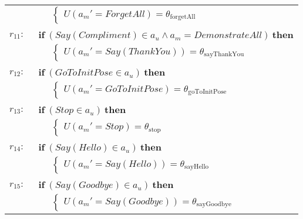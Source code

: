 \begin{footnotesize}
\begin{longtable}{p{1cm}l}
& $\;\;\;\;\; \begin{cases}U(\mathit{a_m}'\!=\!\mathit{ForgetAll})\!=\!\theta_{\mathrm{forgetAll}}\end{cases}$ \\ \\[-1mm]
$r_{11}: \ \ $& $\textbf{if} \ (\mathit{Say(Compliment)}\!\in\!\mathit{a_u} \land \mathit{a_m}\!=\!\mathit{DemonstrateAll}) \ \textbf{then}$ \\
& $\;\;\;\;\; \begin{cases}U(\mathit{a_m}'\!=\!\mathit{Say(ThankYou)})\!=\!\theta_{\mathrm{sayThankYou}}\end{cases}$ \\ \\[-1mm]
$r_{12}: \ \ $& $\textbf{if} \ (\mathit{GoToInitPose}\!\in\!\mathit{a_u}) \ \textbf{then}$ \\
& $\;\;\;\;\; \begin{cases}U(\mathit{a_m}'\!=\!\mathit{GoToInitPose})\!=\!\theta_{\mathrm{goToInitPose}}\end{cases}$  \vspace{1mm} \\  \\[-2mm]
$r_{13}: \ \ $& $\textbf{if} \ (\mathit{Stop}\!\in\!\mathit{a_u}) \ \textbf{then} $\\
& $\;\;\;\;\; \begin{cases}U(\mathit{a_m}'\!=\!\mathit{Stop})\!=\!\theta_{\mathrm{stop}}\end{cases} $ \vspace{1mm} \\  \\[-2mm]
$r_{14}: \ \ $&$ \textbf{if} \ (\mathit{Say(Hello)}\!\in\!\mathit{a_u}) \ \textbf{then} $\\
& $\;\;\;\;\; \begin{cases}U(\mathit{a_m}'\!=\!\mathit{Say(Hello)})\!=\!\theta_{\mathrm{sayHello}}\end{cases}$  \vspace{1mm} \\  \\[-2mm]
$r_{15}: \ \ $&$ \textbf{if} \ (\mathit{Say(Goodbye)}\!\in\!\mathit{a_u}) \ \textbf{then} $\\
& $\;\;\;\;\; \begin{cases}U(\mathit{a_m}'\!=\!\mathit{Say(Goodbye)})\!=\!\theta_{\mathrm{sayGoodbye}}\end{cases}$    \vspace{1mm} \\ 
\end{longtable}
\end{footnotesize}

